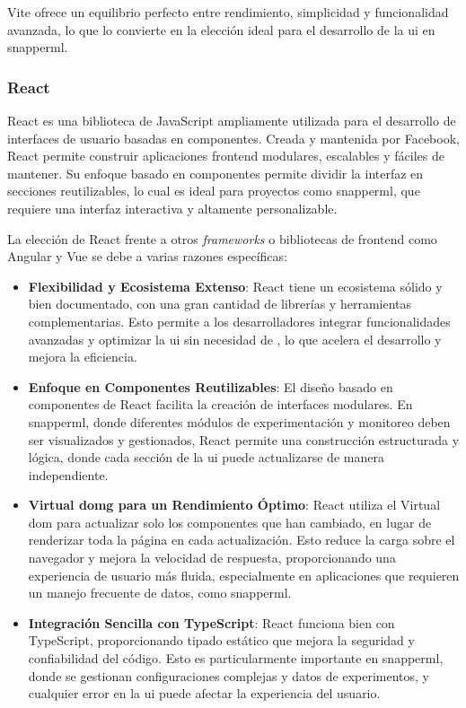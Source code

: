 

Vite ofrece un equilibrio perfecto entre rendimiento, simplicidad y funcionalidad avanzada, lo que lo convierte en la elección ideal para el desarrollo de la \acrlong{ui} en \Gls{snapperml}.

\subsubsection{React}

React es una biblioteca de JavaScript ampliamente utilizada para el desarrollo de interfaces de usuario basadas en componentes. Creada y mantenida por Facebook, React permite construir aplicaciones \gls{frontend} modulares, escalables y fáciles de mantener. Su enfoque basado en componentes permite dividir la interfaz en secciones reutilizables, lo cual es ideal para proyectos como \Gls{snapperml}, que requiere una interfaz interactiva y altamente personalizable.

La elección de React frente a otros \textit{\glspl{framework}} o bibliotecas de \gls{frontend} como Angular y Vue se debe a varias razones específicas:

\begin{itemize}
    \item \textbf{Flexibilidad y Ecosistema Extenso}: React tiene un ecosistema sólido y bien documentado, con una gran cantidad de librerías y herramientas complementarias. Esto permite a los desarrolladores integrar funcionalidades avanzadas y optimizar la \acrshort{ui} sin necesidad de , lo que acelera el desarrollo y mejora la eficiencia.

    \item \textbf{Enfoque en Componentes Reutilizables}: El diseño basado en componentes de React facilita la creación de interfaces modulares. En \Gls{snapperml}, donde diferentes módulos de experimentación y monitoreo deben ser visualizados y gestionados, React permite una construcción estructurada y lógica, donde cada sección de la \acrshort{ui} puede actualizarse de manera independiente.

    \item \textbf{Virtual \Gls{domg} para un Rendimiento Óptimo}: React utiliza el Virtual \acrfull{dom} para actualizar solo los componentes que han cambiado, en lugar de renderizar toda la página en cada actualización. Esto reduce la carga sobre el navegador y mejora la velocidad de respuesta, proporcionando una experiencia de usuario más fluida, especialmente en aplicaciones que requieren un manejo frecuente de datos, como \Gls{snapperml}.

    \item \textbf{Integración Sencilla con TypeScript}: React funciona bien con TypeScript, proporcionando tipado estático que mejora la seguridad y confiabilidad del código. Esto es particularmente importante en \Gls{snapperml}, donde se gestionan configuraciones complejas y datos de experimentos, y cualquier error en la \acrshort{ui} puede afectar la experiencia del usuario.
\end{itemize}

